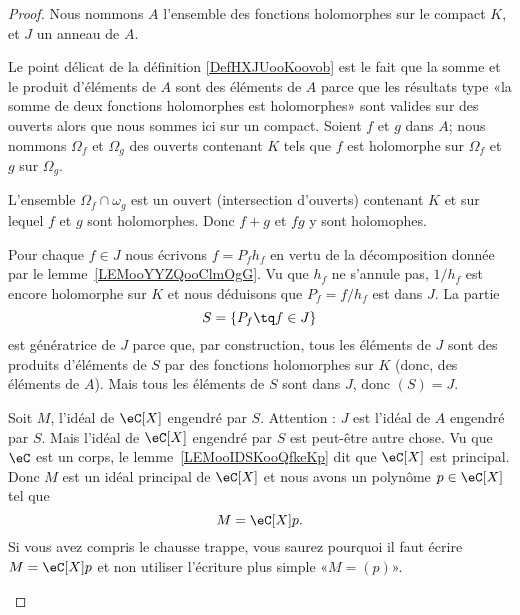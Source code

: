 \begin{proof}
	Nous nommons \( A\) l'ensemble des fonctions holomorphes sur le compact \( K\), et \( J\) un anneau de \( A\).

	\begin{subproof}


		Le point délicat de la définition \ref{DefHXJUooKoovob} est le fait que la somme et le produit d'éléments de \( A\) sont des éléments de \( A\) parce que les résultats type «la somme de deux fonctions holomorphes est holomorphes» sont valides sur des ouverts alors que nous sommes ici sur un compact. Soient \( f\) et \( g\) dans \( A\); nous nommons \( \Omega_f\) et \( \Omega_g\) des ouverts contenant \( K\) tels que \( f\) est holomorphe sur \( \Omega_f\) et \( g\) sur \( \Omega_g\).

		L'ensemble \( \Omega_f\cap\omega_g\) est un ouvert (intersection d'ouverts) contenant \( K\) et sur lequel \( f\) et \( g\) sont holomorphes. Donc \( f+g\) et \( fg\) y sont holomophes.


		Pour chaque \( f\in J\) nous écrivons \( f=P_fh_f\) en vertu de la décomposition donnée par le lemme~\ref{LEMooYYZQooClmOgG}. Vu que \( h_f\) ne s'annule pas, \( 1/h_f\) est encore holomorphe sur \( K\) et nous déduisons que \( P_f=f/h_f\) est dans \( J\).  La partie
		\begin{equation}
			S=\{ P_f\tq f\in J \}
		\end{equation}
		est génératrice de \( J\) parce que, par construction, tous les éléments de \( J\) sont des produits d'éléments de \( S\) par des fonctions holomorphes sur \( K\) (donc, des éléments de \( A\)). Mais tous les éléments de \( S\) sont dans \( J\), donc \( (S)=J\).


		Soit \( M\), l'idéal de \( \eC[X]\) engendré par \( S\). Attention : \( J\) est l'idéal de \( A\) engendré par \( S\). Mais l'idéal de \( \eC[X]\) engendré par \( S\) est peut-être autre chose.  Vu que \( \eC\) est un corps, le lemme~\ref{LEMooIDSKooQfkeKp} dit que \( \eC[X]\) est principal. Donc \( M\) est un idéal principal de \( \eC[X]\) et nous avons un polynôme \( p\in \eC[X]\) tel que
		\begin{equation}
			M=\eC[X]p.
		\end{equation}
		Si vous avez compris le chausse trappe, vous saurez pourquoi il faut écrire \( M=\eC[X]p\) et non utiliser l'écriture plus simple «\( M=(p)\)».


\end{subproof}
\end{proof}
